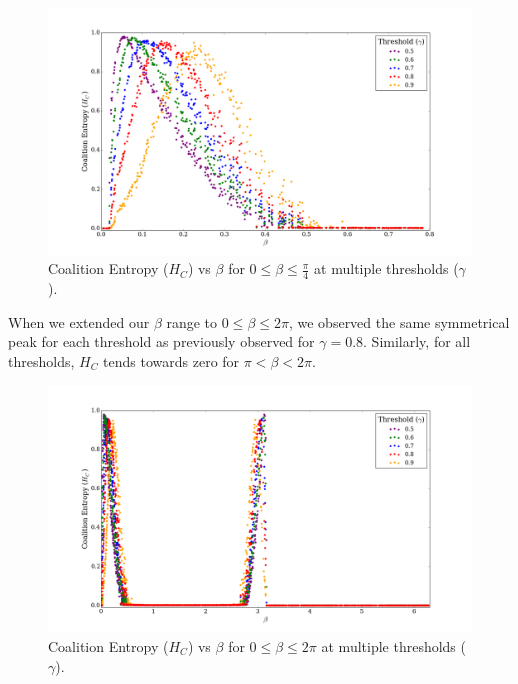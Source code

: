 \documentclass[a4paper,11pt]{article}
\begin{document}
\begin{figure}[H]
\begin{center}
\includegraphics[scale = 0.35]{figures/hc_vs_beta_orig_multi}
\caption{
	Coalition Entropy ($H_C$) vs $\beta$ for $0 \leq \beta \leq \frac{\pi}{4}$ at multiple thresholds ($\gamma$).
	\label{fig:hc-vs-beta-orig-multi}
}
\end{center}
\end{figure}

When we extended our $\beta$ range to $0 \leq \beta \leq 2\pi$, we observed the same symmetrical peak for each threshold as previously observed for $\gamma = 0.8$. Similarly, for all thresholds, $H_C$ tends towards zero for $\pi < \beta< 2\pi$.

\begin{figure}[H]
\begin{center}
\includegraphics[scale = 0.35]{figures/hc_vs_beta_ext_multi}
\caption{
	Coalition Entropy ($H_C$) vs $\beta$ for $0 \leq \beta \leq 2\pi$ at multiple thresholds ($\gamma$).
	\label{fig:hc-vs-beta-ext-multi}
}
\end{center}
\end{figure}
\end{document}
